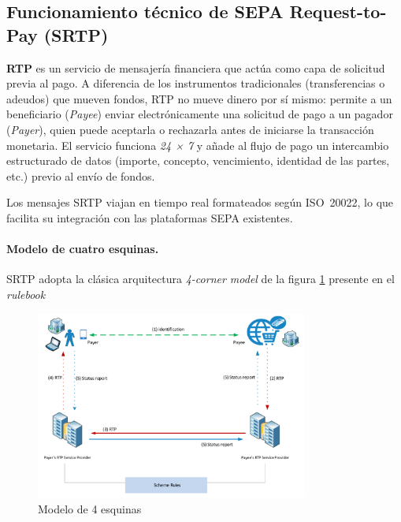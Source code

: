 \subsection{Funcionamiento técnico de SEPA Request-to-Pay (SRTP)}
\label{subsec:funcionamiento-srtp}

\textbf{RTP} es un servicio de mensajería financiera que actúa como capa de solicitud previa al pago. A diferencia de los instrumentos tradicionales (transferencias o adeudos) que mueven fondos, RTP no mueve dinero por sí mismo: permite a un beneficiario (\emph{Payee}) enviar electrónicamente una solicitud de pago a un pagador (\emph{Payer}), quien puede aceptarla o rechazarla antes de iniciarse la transacción monetaria. El servicio funciona \emph{24 × 7} y añade al flujo de pago un intercambio estructurado de datos (importe, concepto, vencimiento, identidad de las partes, etc.) previo al envío de fondos.  

Los mensajes SRTP viajan en tiempo real formateados según ISO~20022, lo que facilita su integración con las plataformas SEPA existentes.

\paragraph{Modelo de cuatro esquinas.} SRTP adopta la clásica arquitectura \emph{4-corner model} \cite{fourcorner_wiki} de la figura \ref{fig:4corner} presente en el \textit{rulebook} \cite{ecp014}

\begin{figure}[htbp]
  \centering
  \includegraphics[width=0.8\textwidth]{Imagenes/4CornerModel.pdf}
  \caption{Modelo de 4 esquinas}
  \label{fig:4corner}
\end{figure}



